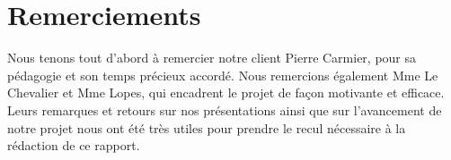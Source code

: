 \section*{Remerciements}

Nous tenons tout d'abord à remercier notre client Pierre Carmier,
pour sa pédagogie et son temps précieux accordé. 
Nous remercions également Mme Le Chevalier et Mme Lopes, qui encadrent
le projet de façon motivante et efficace.
Leurs remarques et retours sur nos présentations 
ainsi que sur l'avancement de notre projet
nous ont été très utiles pour prendre le recul
nécessaire à la rédaction de ce rapport.
